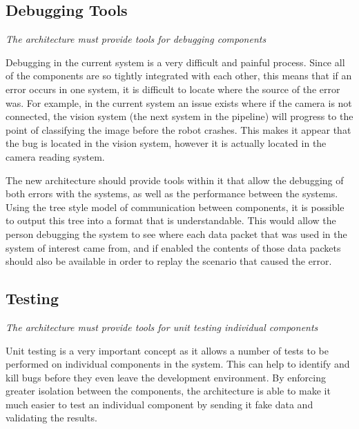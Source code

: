 \documentclass[english,12pt]{scrartcl}
\newcommand{\requirement}[1]{\textit{#1}}
\begin{document}
        \subsection{Debugging Tools}
            \requirement{The architecture must provide tools for debugging components}
            
            Debugging in the current system is a very difficult and painful process. Since all of
            the components are so tightly integrated with each other, this means that if an error
            occurs in one system, it is difficult to locate where the source of the error was. For
            example, in the current system an issue exists where if the camera is not connected, the 
            vision system (the next system in the pipeline) will progress to the point of
            classifying the image before the robot crashes. This makes it appear that the bug is
            located in the vision system, however it is actually located in the camera reading
            system.
             
            The new architecture should provide tools within it that allow the debugging of both
            errors with the systems, as well as the performance between the systems. Using the tree
            style model of communication between components, it is possible to output this tree into
            a format that is understandable. This would allow the person debugging the system to see
            where each data packet that was used in the system of interest came from, and if enabled
            the contents of those data packets should also be available in order to replay the
            scenario that caused the error.
            

        \subsection{Testing}
            \requirement{The architecture must provide tools for unit testing individual components}
            
            Unit testing is a very important concept as it allows a number of tests to be performed
            on individual components in the system. This can help to identify and kill bugs before
            they even leave the development environment. By enforcing greater isolation between the
            components, the architecture is able to make it much easier to test an individual
            component by sending it fake data and validating the results.
            
\end{document}
